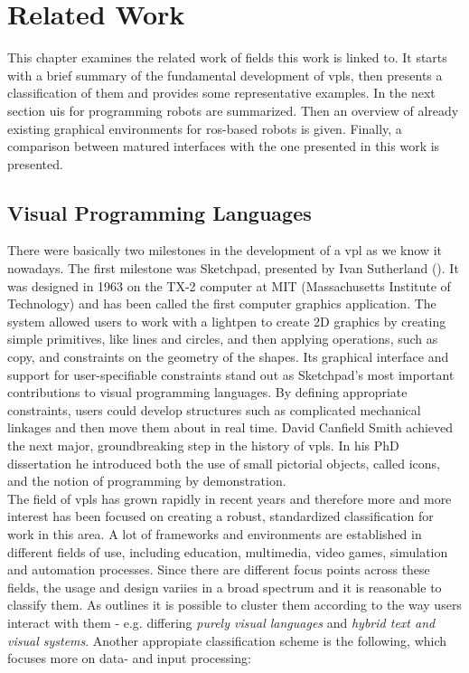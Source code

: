 \chapter{Related Work}
This chapter examines the related work of fields this work is linked to. It starts with a brief summary of the fundamental development of \glspl{vpl}, then presents a classification of them and provides some representative examples. In the next section \glspl{ui} for programming robots are summarized. Then an overview of already existing graphical environments for \gls{ros}-based robots is given. Finally, a comparison between matured interfaces with the one presented in this work is presented.

\section{Visual Programming Languages}
There were basically two milestones in the development of a \gls{vpl} as we know it nowadays. The first milestone was Sketchpad, presented by Ivan Sutherland (\cite{Sutherland:1963}). It was designed in 1963 on the TX-2 computer at MIT (Massachusetts Institute of Technology) and has been called the first computer graphics application. The system allowed users to work with a lightpen to create 2D graphics by creating simple primitives, like lines and circles, and then applying operations, such as copy, and constraints on the geometry of the shapes. Its graphical interface and support for user-specifiable constraints stand out as Sketchpad's most important contributions to visual programming languages. By defining appropriate constraints, users could develop structures such as complicated mechanical linkages and then move them about in real time.\cite{Boshernitsan:CSD-04-1368} David Canfield Smith achieved the next major, groundbreaking step in the history of \glspl{vpl}. In his PhD dissertation \cite{Smith:1975:PCP:907074} he introduced both the use of small pictorial objects, called icons, and the notion of programming by demonstration. \\

The field of \glspl{vpl} has grown rapidly in recent years and therefore more and more interest has been focused on creating a robust, standardized classification for work in this area. A lot of frameworks and environments are established in different fields of use, including education, multimedia, video games, simulation and automation processes. Since there are different focus points across these fields, the usage and design variies in a broad spectrum and it is reasonable to classify them. As \cite{Boshernitsan:CSD-04-1368} outlines it is possible to cluster them according to the way users interact with them - e.g. differing \textit{purely visual languages} and \textit{hybrid text and visual systems}. Another appropiate classification scheme is the following, which focuses more on data- and input processing:

